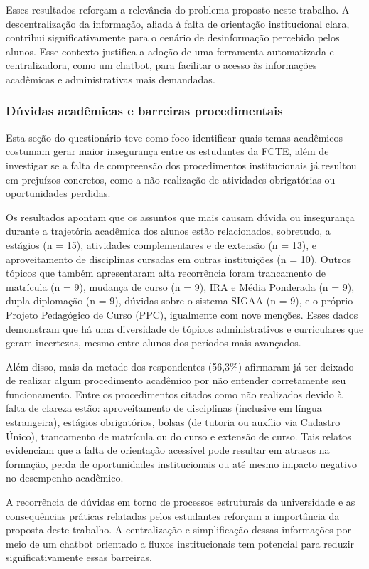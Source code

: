 Esses resultados reforçam a relevância do problema proposto neste trabalho. A descentralização da informação, aliada à falta de orientação institucional clara, contribui significativamente para o cenário de desinformação percebido pelos alunos. Esse contexto justifica a adoção de uma ferramenta automatizada e centralizadora, como um chatbot, para facilitar o acesso às informações acadêmicas e administrativas mais demandadas.

\subsubsection{Dúvidas acadêmicas e barreiras procedimentais}

Esta seção do questionário teve como foco identificar quais temas acadêmicos costumam gerar maior insegurança entre os estudantes da FCTE, além de investigar se a falta de compreensão dos procedimentos institucionais já resultou em prejuízos concretos, como a não realização de atividades obrigatórias ou oportunidades perdidas.

Os resultados apontam que os assuntos que mais causam dúvida ou insegurança durante a trajetória acadêmica dos alunos estão relacionados, sobretudo, a estágios (n = 15), atividades complementares e de extensão (n = 13), e aproveitamento de disciplinas cursadas em outras instituições (n = 10). Outros tópicos que também apresentaram alta recorrência foram trancamento de matrícula (n = 9), mudança de curso (n = 9), IRA e Média Ponderada (n = 9), dupla diplomação (n = 9), dúvidas sobre o sistema SIGAA (n = 9), e o próprio Projeto Pedagógico de Curso (PPC), igualmente com nove menções. Esses dados demonstram que há uma diversidade de tópicos administrativos e curriculares que geram incertezas, mesmo entre alunos dos períodos mais avançados.

Além disso, mais da metade dos respondentes (56{,}3\%) afirmaram já ter deixado de realizar algum procedimento acadêmico por não entender corretamente seu funcionamento. Entre os procedimentos citados como não realizados devido à falta de clareza estão: aproveitamento de disciplinas (inclusive em língua estrangeira), estágios obrigatórios, bolsas (de tutoria ou auxílio via Cadastro Único), trancamento de matrícula ou do curso e extensão de curso. Tais relatos evidenciam que a falta de orientação acessível pode resultar em atrasos na formação, perda de oportunidades institucionais ou até mesmo impacto negativo no desempenho acadêmico.

A recorrência de dúvidas em torno de processos estruturais da universidade e as consequências práticas relatadas pelos estudantes reforçam a importância da proposta deste trabalho. A centralização e simplificação dessas informações por meio de um chatbot orientado a fluxos institucionais tem potencial para reduzir significativamente essas barreiras.

